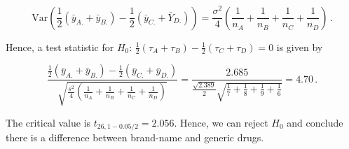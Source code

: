 \documentclass[
]{book}
\theoremstyle{definition}
\theoremstyle{definition}
\theoremstyle{definition}
\theoremstyle{definition}
\theoremstyle{remark}
\begin{document}
\begin{enumerate}
  \[\mbox{Var}\left(\frac{1}{2}(\bar{y}_{A.}+\bar{y}_{B.}) - \frac{1}{2}(\bar{y}_{C.}+\bar{Y}_{D.})\right) = \frac{\sigma^2}{4}\left(\frac{1}{n_A} + \frac{1}{n_B} + \frac{1}{n_C} + \frac{1}{n_D}\right)\,.\]

  Hence, a test statistic for \(H_0:\, \frac{1}{2}(\tau_A+\tau_B) - \frac{1}{2}(\tau_C+\tau_D)=0\) is given by

  \[
  \frac{\frac{1}{2}(\bar{y}_{A.}+\bar{y}_{B.}) - \frac{1}{2}(\bar{y}_{C.}+\bar{y}_{D.})}{\sqrt{\frac{s^2}{4}\left(\frac{1}{n_A} + \frac{1}{n_B} + \frac{1}{n_C} + \frac{1}{n_D}\right)}} = \frac{2.685}{\frac{\sqrt{2.389}}{2}\sqrt{\frac{1}{7} + \frac{1}{8} + \frac{1}{9} + \frac{1}{6}}} = 4.70\,.
   \]

  The critical value is \(t_{26, 1-0.05/2} = 2.056\). Hence, we can reject \(H_0\) and conclude there is a difference between brand-name and generic drugs.
\end{enumerate}
\end{document}
